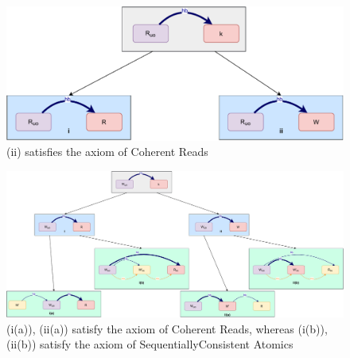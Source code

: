     \begin{figure}[H]
        \centering
        \includegraphics[scale=0.6]{InstructionReordering/ValidReorderingProof/ProofParts/Part4/part4(c).pdf}
        \caption{(ii) satisfies the axiom of Coherent Reads}
        \label{fig:my_label}
    \end{figure}
    
    \begin{figure}[H]
        \centering
        \includegraphics[scale=0.4]{InstructionReordering/ValidReorderingProof/ProofParts/Part4/part4(d).pdf}
        \caption{(i(a)), (ii(a)) satisfy the axiom of Coherent Reads, whereas (i(b)), (ii(b)) satisfy the axiom of SequentiallyConsistent Atomics}
        \label{fig:my_label}
    \end{figure}
    
    